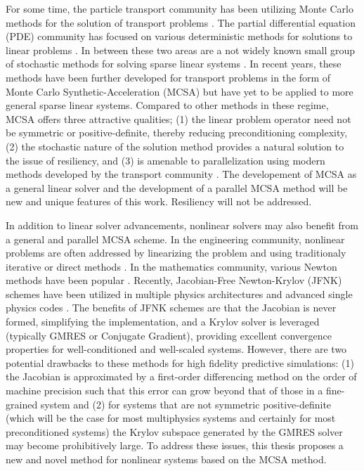 For some time, the particle transport community has been utilizing
Monte Carlo methods for the solution of transport problems
\citep{lewis_1993}. The partial differential equation (PDE) community
has focused on various deterministic methods for solutions to linear
problems \citep{saad_2003}. In between these two areas are a not widely
known small group of stochastic methods for solving sparse linear
systems \citep{hammersley_1964, halton_1962, halton_1994}. In recent
years, these methods have been further developed for transport
problems in the form of Monte Carlo Synthetic-Acceleration (MCSA)
\citep{evans_2003, evans_2009} but have yet to be applied to more
general sparse linear systems. Compared to other methods in these
regime, MCSA offers three attractive qualities; (1) the linear problem
operator need not be symmetric or positive-definite, thereby reducing
preconditioning complexity, (2) the stochastic nature of the
solution method provides a natural solution to the issue of resiliency,
and (3) is amenable to parallelization using modern methods developed by
the transport community \citep{wagner_2011}. The developement of MCSA
as a general linear solver and the development of a parallel MCSA
method will be new and unique features of this work. Resiliency will
not be addressed.

In addition to linear solver advancements, nonlinear solvers may also
benefit from a general and parallel MCSA scheme. In the engineering
community, nonlinear problems are often addressed by linearizing the
problem and using traditionaly iterative or direct methods
\citep{tannehill_1997}. In the mathematics community, various Newton
methods have been popular \citep{kelley_1995}. Recently, Jacobian-Free
Newton-Krylov (JFNK) schemes \citep{knoll_2004} have been utilized in
multiple physics architectures and advanced single physics codes
\citep{gaston_2009}. The benefits of JFNK schemes are that the Jacobian
is never formed, simplifying the implementation, and a Krylov solver
is leveraged (typically GMRES or Conjugate Gradient), providing
excellent convergence properties for well-conditioned and well-scaled
systems. However, there are two potential drawbacks to these methods
for high fidelity predictive simulations: (1) the Jacobian is
approximated by a first-order differencing method on the order of
machine precision such that this error can grow beyond that of those
in a fine-grained system and (2) for systems that are not symmetric
positive-definite (which will be the case for most multiphysics
systems and certainly for most preconditioned systems) the Krylov
subspace generated by the GMRES solver may become prohibitively
large. To address these issues, this thesis proposes a new and novel
method for nonlinear systems based on the MCSA method.

